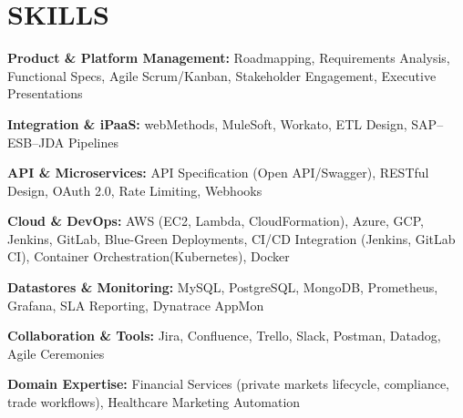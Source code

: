 \documentclass[letterpaper,11pt]{article}
\begin{document}
\section{\color{airforceblue}SKILLS}
 \begin{itemize}[leftmargin=0in, label={}]
    \small{\item{
     \textbf{\normalsize{Product \& Platform Management:}}{ \normalsize{Roadmapping, Requirements Analysis, Functional Specs, Agile Scrum/Kanban, Stakeholder Engagement, Executive Presentations}} \\
      \vspace{1.2pt}
      
     \textbf{\normalsize{Integration \& iPaaS:}}{ \normalsize{webMethods, MuleSoft, Workato, ETL Design, SAP–ESB–JDA Pipelines}} \\
      \vspace{1.2pt}
      
     \textbf{\normalsize{API \& Microservices:}}{ \normalsize{API Specification (Open API/Swagger), RESTful Design, OAuth 2.0, Rate Limiting, Webhooks}} \\
      \vspace{1.2pt}
      
     \textbf{\normalsize{Cloud \& DevOps:}}{ \normalsize{AWS (EC2, Lambda, CloudFormation), Azure, GCP, Jenkins, GitLab, Blue-Green Deployments, CI/CD Integration (Jenkins, GitLab CI), Container Orchestration(Kubernetes), Docker}} \\
      \vspace{1.2pt}
      
     \textbf{\normalsize{Datastores \& Monitoring:}}{ \normalsize{MySQL, PostgreSQL, MongoDB, Prometheus, Grafana, SLA Reporting, Dynatrace AppMon}} \\
      \vspace{1.2pt}
      
     \textbf{\normalsize{Collaboration \& Tools:}}{ \normalsize{Jira, Confluence, Trello, Slack, Postman, Datadog, Agile Ceremonies}} \\
      \vspace{1.2pt}
      
     \textbf{\normalsize{Domain Expertise:}}{ \normalsize{Financial Services (private markets lifecycle, compliance, trade workflows), Healthcare Marketing Automation}}

     }}
 \end{itemize}
 \vspace{-16pt}
\end{document}
